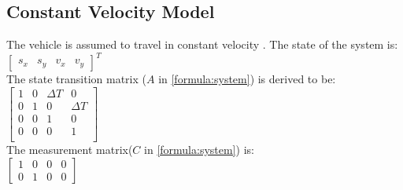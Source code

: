 \subsection{Constant Velocity Model}
The vehicle is assumed to travel in constant velocity \cite{Schubert2008}. The state of the system is:\\
$\left[\begin{matrix}
s_x & s_y & v_x & v_y
\end{matrix}\right]^{T}$\\
The state transition matrix ($A$ in \eqref{formula:system}) is derived to be:\\
$\left[\begin{matrix}
1 & 0 & \Delta T & 0\\
0 & 1 & 0 & \Delta T\\
0 & 0 & 1 & 0\\
0 & 0 & 0 & 1\\
\end{matrix}\right]$\\
The measurement matrix($C$ in \eqref{formula:system}) is:\\
$\left[\begin{matrix}
1 & 0 & 0 & 0\\
0 & 1 & 0 & 0
\end{matrix}\right]$\\

